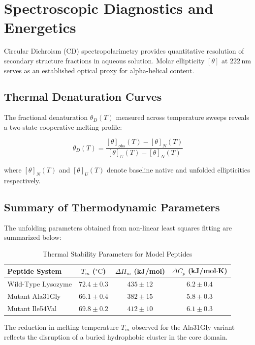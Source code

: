\chapter{Spectroscopic Diagnostics and Energetics}
\label{ch:experimental_results}

Circular Dichroism (CD) spectropolarimetry provides quantitative resolution of secondary structure fractions in aqueous solution. Molar ellipticity $[\theta]$ at $222\,\text{nm}$ serves as an established optical proxy for alpha-helical content.

\section{Thermal Denaturation Curves}
The fractional denaturation $\theta_D(T)$ measured across temperature sweeps reveals a two-state cooperative melting profile:

\begin{equation}
  \theta_D(T) = \frac{[\theta]_{obs}(T) - [\theta]_N(T)}{[\theta]_U(T) - [\theta]_N(T)}
  \label{eq:fraction_denatured}
\end{equation}

where $[\theta]_N(T)$ and $[\theta]_U(T)$ denote baseline native and unfolded ellipticities respectively.

\section{Summary of Thermodynamic Parameters}
The unfolding parameters obtained from non-linear least squares fitting are summarized below:

\begin{table}[htbp]
  \centering
  \caption{Thermal Stability Parameters for Model Peptides}
  \label{tab:melting_params}
  \begin{tabular}{lccc}
    \toprule
    Peptide System & $T_m$ ($^\circ\text{C}$) & $\Delta H_m$ (kJ/mol) & $\Delta C_p$ (kJ/mol$\cdot$K) \\
    \midrule
    Wild-Type Lysozyme & $72.4 \pm 0.3$ & $435 \pm 12$ & $6.2 \pm 0.4$ \\
    Mutant Ala31Gly    & $66.1 \pm 0.4$ & $382 \pm 15$ & $5.8 \pm 0.3$ \\
    Mutant Ile54Val    & $69.8 \pm 0.2$ & $412 \pm 10$ & $6.1 \pm 0.3$ \\
    \bottomrule
  \end{tabular}
\end{table}

The reduction in melting temperature $T_m$ observed for the Ala31Gly variant reflects the disruption of a buried hydrophobic cluster in the core domain.
